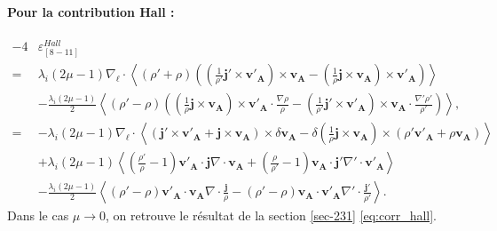 \paragraph{Pour la contribution Hall :}
\begin{equation}\begin{array}{rl}
  \label{eq:turb_bin_TEMH} - 4  &\varepsilon^{Hall}_{[8-11]}\\ %
    =&\lambda_i\left(2\mu-1 \right)\nabla_{\boldsymbol{\ell}} \cdot \left< \left(\rho' + \rho\right) \left( \left(\frac{1}{\rho'}\boldsymbol{j'} \times \boldsymbol{v'_A}\right)\times \boldsymbol{v_A}  -  \left(\frac{1}{\rho}\boldsymbol{j} \times \boldsymbol{v_A}\right)\times \boldsymbol{v'_A}\right)\right>  \\%
  &- \frac{\lambda_i\left(2\mu-1 \right)}{2} \left<\left(\rho' - \rho\right) \left(\left(\frac{1}{\rho}\boldsymbol{j} \times \boldsymbol{v_A}\right)\times \boldsymbol{v'_A} \cdot \frac{\nabla  \rho }{\rho}-\left(\frac{1}{\rho'}\boldsymbol{j'} \times \boldsymbol{v'_A}\right)\times \boldsymbol{v_A}\cdot \frac{\nabla'  \rho' }{\rho'}\right)\right>, \\%
  =&- \lambda_i\left(2\mu-1 \right)\nabla_{\boldsymbol{\ell}} \cdot \left< \left(\boldsymbol{j'} \times \boldsymbol{v'_A} + \boldsymbol{j} \times \boldsymbol{v_A}\right)\times \delta \boldsymbol{v_A}  - \delta \left(\frac{1}{\rho}\boldsymbol{j} \times \boldsymbol{v_A}\right)\times \left( \rho'\boldsymbol{v'_A} +  \rho\boldsymbol{v_A}\right) \right>  \\%
   &+ \lambda_i\left(2\mu-1 \right) \left<\left(\frac{\rho'}{\rho} - 1\right) \boldsymbol{v'_A} \cdot \boldsymbol{j} \nabla\cdot \boldsymbol{v_A} +\left(\frac{\rho}{\rho'}-1\right) \boldsymbol{v_A} \cdot  \boldsymbol{j'}\nabla'\cdot  \boldsymbol{v'_A} \right> \\%
  &- \frac{\lambda_i\left(2\mu-1 \right)}{2} \left<   \left(\rho' - \rho\right) \boldsymbol{v'_A}\cdot \boldsymbol{v_A}  \nabla  \cdot\frac{\boldsymbol{j}}{\rho} - \left(\rho' - \rho\right)\boldsymbol{v_A} \cdot \boldsymbol{v'_A}\nabla'  
  \cdot \frac{ \boldsymbol{j'} }{\rho'}\right>. 
\end{array}\end{equation}
Dans le cas $\mu \rightarrow 0$, on retrouve le résultat de la section \ref{sec-231} \eqref{eq:corr_hall}. 
